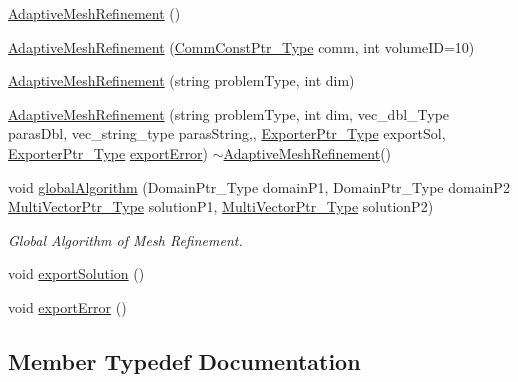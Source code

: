 \begin{DoxyCompactItemize}
\item 
\hyperlink{classFEDD_1_1AdaptiveMeshRefinement_a259e41c282b1db70f233ac94854ba8bd}{Adaptive\+Mesh\+Refinement} ()
\item 
\hyperlink{classFEDD_1_1AdaptiveMeshRefinement_a3c39f02b73abebe017642e83a8f5b3bc}{Adaptive\+Mesh\+Refinement} (\hyperlink{classFEDD_1_1AdaptiveMeshRefinement_a6bd5089532bd8dac39bebc4a92e33c40}{Comm\+Const\+Ptr\+\_\+\+Type} comm, int volume\+ID=10)
\item 
\hyperlink{classFEDD_1_1AdaptiveMeshRefinement_a90df20bfec3fa56bb731e39b2008dd8f}{Adaptive\+Mesh\+Refinement} (string problem\+Type, int dim)
\item 
\hyperlink{classFEDD_1_1AdaptiveMeshRefinement_afbfd75b4f7579382147c6ca96f14b3b0}{Adaptive\+Mesh\+Refinement} (string problem\+Type, int dim, vec\+\_\+dbl\+\_\+\+Type paras\+Dbl, vec\+\_\+string\+\_\+type paras\+String,, \hyperlink{classFEDD_1_1AdaptiveMeshRefinement_ac8cda8533e68f9049ede0208be2175d6}{Exporter\+Ptr\+\_\+\+Type} export\+Sol, \hyperlink{classFEDD_1_1AdaptiveMeshRefinement_ac8cda8533e68f9049ede0208be2175d6}{Exporter\+Ptr\+\_\+\+Type} \hyperlink{classFEDD_1_1AdaptiveMeshRefinement_a1dc2d35c4ddb08d1ffeacc66abf4da89}{export\+Error}) $\sim$\hyperlink{classFEDD_1_1AdaptiveMeshRefinement}{Adaptive\+Mesh\+Refinement}()
\item 
void \hyperlink{classFEDD_1_1AdaptiveMeshRefinement_af882598ec6c8af6d1d755b088b324db1}{global\+Algorithm} (Domain\+Ptr\+\_\+\+Type domain\+P1, Domain\+Ptr\+\_\+\+Type domain\+P2 \hyperlink{classFEDD_1_1AdaptiveMeshRefinement_af4fb11adbdf1bba9bcaf8952324d32f2}{Multi\+Vector\+Ptr\+\_\+\+Type} solution\+P1, \hyperlink{classFEDD_1_1AdaptiveMeshRefinement_af4fb11adbdf1bba9bcaf8952324d32f2}{Multi\+Vector\+Ptr\+\_\+\+Type} solution\+P2)
\begin{DoxyCompactList}\small\item\em Global Algorithm of Mesh Refinement. \end{DoxyCompactList}\item 
void \hyperlink{classFEDD_1_1AdaptiveMeshRefinement_a3e2a80f6e9caad8507b0d1afb0537e53}{export\+Solution} ()
\item 
void \hyperlink{classFEDD_1_1AdaptiveMeshRefinement_a1dc2d35c4ddb08d1ffeacc66abf4da89}{export\+Error} ()
\end{DoxyCompactItemize}


\subsection{Member Typedef Documentation}
\mbox{\label{classFEDD_1_1AdaptiveMeshRefinement_a6bd5089532bd8dac39bebc4a92e33c40}} 
